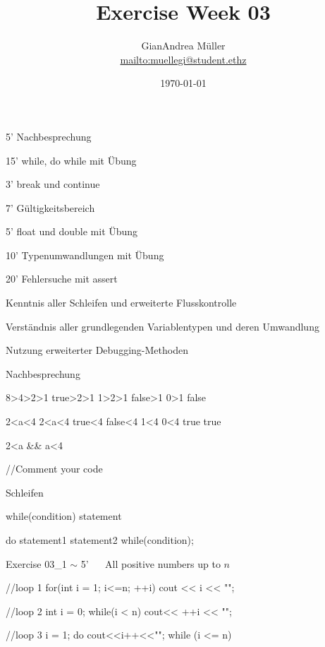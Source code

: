 \ifnum\conditionmacro=1 \documentclass[handout,usenames,dvipsnames]{beamer}\fi
\title{Exercise Week 03}
\author{GianAndrea Müller\\ \url{mailto:muellegi@student.ethz}}
\date{\today}
\begin{document}
\maketitle

\begin{TFTimeSchedule}
\item 5' Nachbesprechung 
\item 15' while, do while mit Übung
\item 3' break und continue
\item 7' Gültigkeitsbereich
\item 5' float und double mit Übung
\item 10' Typenumwandlungen mit Übung
\item 20' Fehlersuche mit assert
\end{TFTimeSchedule}

\begin{TFLearningObjectives}
\item Kenntnis aller Schleifen und erweiterte Flusskontrolle
\item Verständnis aller grundlegenden Variablentypen und deren Umwandlung
\item Nutzung erweiterter Debugging-Methoden
\end{TFLearningObjectives}

\begin{frame}[fragile]{Nachbesprechung}
\begin{TFCpp}
8>4>2>1
true>2>1
1>2>1
false>1
0>1
false

2<a<4     2<a<4
true<4    false<4
1<4       0<4
true      true

2<a && a<4

//Comment your code
\end{TFCpp}
\end{frame}


\begin{frame}[fragile]{Schleifen}
\begin{TFCpp}
while(condition)
	statement


do{
	statement1
	statement2
}
while(condition);
\end{TFCpp}
\end{frame}

\begin{frame}[fragile]{Exercise 03\_1 $\sim$ 5' $\quad$ All positive numbers up to $n$}
\begin{TFCpp}
//loop 1
for(int i = 1; i<=n; ++i)
	cout << i << "\n";
	
//loop 2
int i = 0;
while(i < n)
	cout<< ++i << "\n";
	
//loop 3
i = 1;
do
	cout<<i++<<"\n";
while (i <= n)
\end{TFCpp}
\end{frame}
\end{document}
